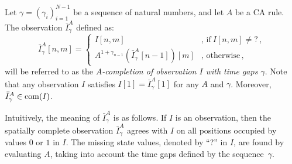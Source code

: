 
Let $\gamma=(\gamma_i)_{i=1}^{N-1}$ be a sequence of natural numbers, and let $A$ be a CA rule. The observation $\bar{I}^A_{\gamma}$ defined as:
\[
	\bar{I}^A_{\gamma}[n,m] = \begin{cases}
		I[n,m]                                         & ,\,\textrm{if}\ I[n,m]\neq{}?\,, \\
		A^{1+\gamma_{n-1}}(\bar{I}^A_{\gamma}[n-1])[m] & ,\,\textrm{otherwise}\,,
	\end{cases}
\]
will be referred to as the \emph{$A$-completion of observation $I$ with time gaps $\gamma$}. Note that any observation $I$ satisfies $I[1] = \bar{I}^A_{\gamma}[1]$ for any $A$ and $\gamma$. Moreover, $\bar{I}^A_{\gamma}\in\operatorname{com}(I)$.

Intuitively, the meaning of $\bar{I}^A_{\gamma}$ is as follows. If $I$ is an observation, then the spatially complete observation $\bar{I}^A_{\gamma}$ agrees with $I$ on all positions occupied by values $0$ or $1$ in $I$. The missing state values, denoted by ``?'' in $I$, are found by evaluating $A$, taking into account the time gaps defined by the sequence~$\gamma$.


